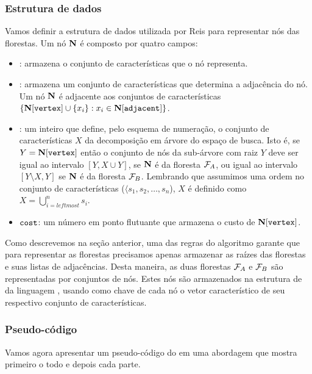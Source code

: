 \subsubsection{Estrutura de dados}
Vamos definir a estrutura de dados utilizada por Reis para representar
nós das florestas. Um nó $\mathbf N$ é composto por quatro campos:
\begin{itemize}
    \item{:} armazena o conjunto de características que 
        o nó representa. 
    \item{:} armazena um conjunto de características
        que determina a adjacência do nó. Um nó $\mathbf N$ é 
        adjacente aos conjuntos de características 
        $\{\mathbf N[\texttt{vertex}] \cup \{x_i\} : x_i \in \mathbf N[\texttt{adjacent}]\}$.
    \item{}: um inteiro que define, pelo esquema de
        numeração, o conjunto de características $X$ da decomposição
        em árvore do espaço de busca. Isto é, se
        $Y = \mathbf N[\texttt{vertex}]$ então o conjunto de nós da 
        sub-árvore com raiz $Y$ deve ser igual ao intervalo 
        $[Y, X \cup Y]$, se $\mathbf N$ é da floresta $\mathcal{F}_A$, ou
        igual ao intervalo $[Y \setminus X, Y]$ se $\mathbf N$ é da 
        floresta $\mathcal{F}_B$. Lembrando que assumimos uma ordem no 
        conjunto de características ($\langle s_1, s_2, \dots, s_n$), 
        $X$ é definido como 
            $X = \bigcup_{i = leftmost}^{n} s_i$.
    \item{$\texttt{cost}$:} um número em ponto flutuante que armazena
        o custo de $\mathbf N[\texttt{vertex}]$.
\end{itemize}

Como descrevemos na seção anterior, uma das regras do algoritmo garante
que para representar as florestas precisamos apenas armazenar as raízes
das florestas e suas listas de adjacências. Desta maneira, as duas 
florestas $\mathcal{F}_A$ e $\mathcal{F}_B$ são representadas por conjuntos de
nós. Estes nós são armazenados na estrutura de  da 
linguagem , usando como chave de cada nó o vetor 
característico de seu respectivo conjunto de características.
\newpage
\subsubsection{Pseudo-código}
Vamos agora apresentar um pseudo-código do  em uma 
abordagem que mostra primeiro o todo e depois cada parte.

